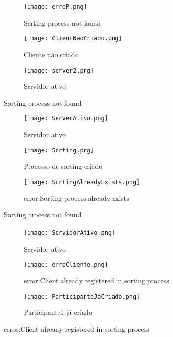 \documentclass{report}
\begin{document}
\begin{figure}[h!]
\centering
\begin{subfigure}{.5\textwidth}
  \centering
  \texttt{[image: erroP.png]}
  \caption{Sorting process not found}
\end{subfigure}%
\begin{subfigure}{.5\textwidth}
  \centering
  \texttt{[image: ClientNaoCriado.png]}
  \caption{Cliente não criado}
\end{subfigure}
\begin{subfigure}{.5\textwidth}
  \centering
  \texttt{[image: server2.png]}
  \caption{Servidor ativo}
\end{subfigure}%
	\caption{Sorting process not found}
\end{figure}

\begin{figure}[h!]
\centering
\begin{subfigure}{.5\textwidth}
  \centering
  \texttt{[image: ServerAtivo.png]}
  \caption{Servidor ativo}
\end{subfigure}%
\begin{subfigure}{.5\textwidth}
  \centering
  \texttt{[image: Sorting.png]}
  \caption{Processo de sorting criado}
\end{subfigure}
\begin{subfigure}{.5\textwidth}
  \centering
  \texttt{[image: SortingAlreadyExists.png]}
  \caption{error:Sorting process already exists}
\end{subfigure}%
	\caption{Sorting process not found}
\end{figure}
\paragraph{}

\begin{figure}[h!]
\centering
\begin{subfigure}{.5\textwidth}
  \centering
  \texttt{[image: ServidorAtivo.png]}
  \caption{Servidor ativo}
\end{subfigure}%
\begin{subfigure}{.5\textwidth}
  \centering
  \texttt{[image: erroCliente.png]}
  \caption{error:Client already registered in sorting process}
\end{subfigure}
\begin{subfigure}{.5\textwidth}
  \centering
  \texttt{[image: ParticipanteJaCriado.png]}
  \caption{Participante1 já criado}
\end{subfigure}%
	\caption{error:Client already registered in sorting process}
\end{figure}
\end{document}
